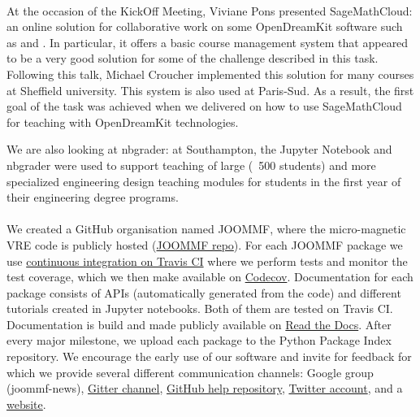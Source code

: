 \documentclass{deliverablereport}
\begin{document}
\paragraph{}

At the occasion of the KickOff Meeting, Viviane Pons presented SageMathCloud: an online solution for collaborative
work on some OpenDreamKit software such as \Sage and \Jupyter. In particular, it offers a basic course management system that appeared to be a very good solution for some of the challenge described in this task. Following this talk, Michael Croucher implemented this solution for many courses at Sheffield university. This system is also used at Paris-Sud. As a result, the first goal of the task was achieved when we delivered  on how to use SageMathCloud for teaching with OpenDreamKit technologies. 

We are also looking at nbgrader: at Southampton, the Jupyter Notebook and nbgrader were used to support teaching of large (~500 students) and more specialized engineering design teaching modules for students in the first year of their engineering degree programs.

\paragraph{}
\label{dissem@dissemination-of-oommf-nb-virtual-environment}

We created a GitHub organisation named JOOMMF, where the micro-magnetic VRE code is publicly hosted (\href{https://github.com/joommf}{JOOMMF repo}). For each JOOMMF package we use \href{https://travis-ci.org/joommf/discretisedfield}{continuous integration on Travis CI} where we perform tests and monitor the test coverage, which we then make available on \href{https://codecov.io/}{Codecov}. Documentation for each package consists of APIs (automatically generated from the code) and different tutorials created in Jupyter notebooks. Both of them are tested on Travis CI. Documentation is build and made publicly available on \href{http://discretisedfield.readthedocs.io}{Read the Docs}. After every major milestone, we upload each package to the Python Package Index repository. We encourage the early use of our software and invite for feedback for which we provide several different communication channels: Google group (joommf-news), \href{https://gitter.im/joommf/}{Gitter channel}, \href{https://github.com/joommf/help}{GitHub help repository}, \href{https://twitter.com/joommf}{Twitter account}, and a \href{http://joommf.github.io/}{website}.
\end{document}
